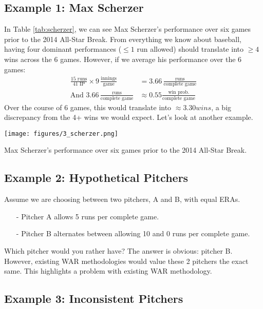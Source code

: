 \documentclass[twoside]{article}
\theoremstyle{definition}
\begin{document}
\subsection{Example 1: Max Scherzer}

In Table \ref{tab:scherzer}, we can see Max Scherzer's performance over six games prior to the 2014 All-Star Break. From everything we know about baseball, having four dominant performances ($\leq 1$ run allowed) should translate into $\geq 4$ wins across the 6 games. However, if we average his performance over the 6 games:
\begin{align*}
    \frac{15 \text{ runs}}{41 \text{ IP}} \times 9\, \frac{\text{innings}}{\text{game}} &= 3.66\, \frac{\text{runs}}{\text{complete game}} \\
    \text{And } 3.66\, \frac{\text{runs}}{\text{complete game}} &\approx 0.55 \frac{\text{win prob.}}{\text{complete game}}
\end{align*}
Over the course of 6 games, this would translate into $\approx 3.30 wins$, a big discrepancy from the 4+ wins we would expect. Let's look at another example.

\begin{table}[H]
    \centering
    \texttt{[image: figures/3\_scherzer.png]}
    \caption{Max Scherzer's performance over six games prior to the 2014 All-Star Break.}
    \label{tab:scherzer}
\end{table}

\subsection{Example 2: Hypothetical Pitchers}

Assume we are choosing between two pitchers, A and B, with equal ERAs.
\begin{itemize}
    \item[-] Pitcher A allows 5 runs per complete game.
    \item[-] Pitcher B alternates between allowing 10 and 0 runs per complete game.
\end{itemize}

Which pitcher would you rather have? The answer is obvious: pitcher B. However, existing WAR methodologies would value these 2 pitchers the exact same. This highlights a problem with existing WAR methodology.

\subsection{Example 3: Inconsistent Pitchers}
\end{document}
